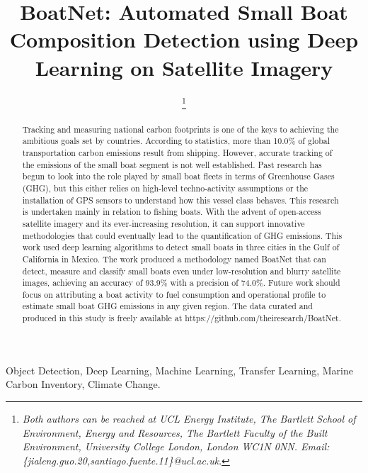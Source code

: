 \documentclass[lettersize,journal]{IEEEtran}
\begin{document}
\title{BoatNet: Automated Small Boat Composition Detection using Deep Learning on Satellite Imagery}

\author{

\thanks{\textit{
Both authors can be reached at UCL Energy Institute, The Bartlett School of Environment, Energy and Resources, The Bartlett Faculty of the Built Environment, University College London, London WC1N 0NN. Email: \{jialeng.guo.20,santiago.fuente.11\}@ucl.ac.uk}.} 
}



\maketitle

\begin{abstract}
Tracking and measuring national carbon footprints is one of the keys to achieving the ambitious goals set by countries. According to statistics, more than 10.0\% of global transportation carbon emissions result from shipping. However, accurate tracking of the emissions of the small boat segment is not well established. Past research has begun to look into the role played by small boat fleets in terms of Greenhouse Gases (GHG), but this either relies on high-level techno-activity assumptions or the installation of GPS sensors to understand how this vessel class behaves. This research is undertaken mainly in relation to fishing boats. With the advent of open-access satellite imagery and its ever-increasing resolution, it can support innovative methodologies that could eventually lead to the quantification of GHG emissions. This work used deep learning algorithms to detect small boats in three cities in the Gulf of California in Mexico. The work produced a methodology named BoatNet that can detect, measure and classify small boats even under low-resolution and blurry satellite images, achieving an accuracy of 93.9\% with a precision of 74.0\%. Future work should focus on attributing a boat activity to fuel consumption and operational profile to estimate small boat GHG emissions in any given region. The data curated and produced in this study is freely available at https://github.com/theiresearch/BoatNet.
\end{abstract}


\begin{IEEEkeywords}
Object Detection, Deep Learning, Machine Learning, Transfer Learning, Marine Carbon Inventory, Climate Change.
\end{IEEEkeywords}
\end{document}
